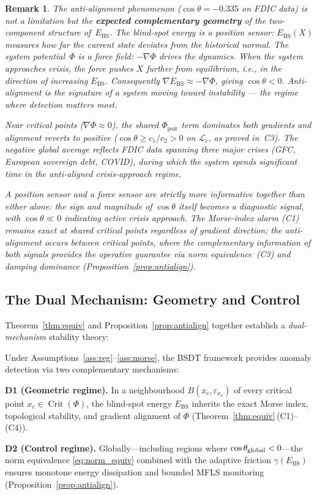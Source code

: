 \documentclass[final]{siamltex}
\providecommand{\grad}{\nabla}
\newcommand{\Ebs}{E_{\mathrm{BS}}}
\newcommand{\costheta}{\cos\theta}
\newtheorem{remark}[theorem]{Remark}
\begin{document}
\begin{remark}\label{rem:antialign_meaning}
The anti-alignment phenomenon ($\costheta = -0.335$ on FDIC data)
is not a limitation but the \textbf{expected complementary geometry}
of the two-component structure of~$\Ebs$.  The blind-spot energy
is a \emph{position sensor}: $\Ebs(X)$ measures how far the
current state deviates from the historical normal.  The system
potential~$\Phi$ is a \emph{force field}: $-\grad\Phi$ drives the
dynamics.  When the system approaches crisis, the force pushes $X$
further from equilibrium, i.e., in the direction of increasing
$\Ebs$.  Consequently $\grad\Ebs \approx -\grad\Phi$, giving
$\costheta < 0$.  Anti-alignment is the signature of a system
moving toward instability --- the regime where detection matters
most.

Near critical points ($\grad\Phi \approx 0$), the shared
$\Phi_{\mathrm{pair}}$ term dominates both gradients and
alignment reverts to positive ($\costheta \ge c_1/c_2 > 0$
on $\mathcal{L}_c$, as proved in~C3).  The negative global
average reflects FDIC data spanning three major crises
(GFC, European sovereign debt, COVID), during which the
system spends significant time in the anti-aligned
crisis-approach regime.

A position sensor and a force sensor are \emph{strictly more
informative together} than either alone: the sign and magnitude
of $\costheta$ itself becomes a diagnostic signal, with
$\costheta \ll 0$ indicating active crisis approach.
The Morse-index alarm (C1) remains exact at shared critical
points regardless of gradient direction; the anti-alignment
occurs between critical points, where the complementary
information of both signals provides the operative guarantee
via norm equivalence~(C3) and damping dominance
(Proposition~\ref{prop:antialign}).
\end{remark}

\subsection{The Dual Mechanism: Geometry and Control}\label{sec:dual}

Theorem~\ref{thm:equiv} and Proposition~\ref{prop:antialign}
together establish a \emph{dual-mechanism} stability theory:

\begin{theorem}\label{thm:dual}
Under Assumptions~\ref{ass:reg}--\ref{ass:morse}, the BSDT
framework provides anomaly detection via two complementary mechanisms:

\textbf{D1 (Geometric regime).}
In a neighbourhood $B(x_c,\varepsilon_{x_c})$ of every
critical point $x_c\in\operatorname{Crit}(\Phi)$, the blind-spot
energy $\Ebs$ inherits the exact Morse index, topological stability,
and gradient alignment of $\Phi$
(Theorem~\ref{thm:equiv}\,(C1)--(C4)).

\textbf{D2 (Control regime).}
Globally---including regions where
$\cos\theta_{\textup{global}} < 0$---the norm equivalence
\eqref{eq:norm_equiv} combined with the adaptive friction
$\gamma(\Ebs)$ ensures monotone energy dissipation and bounded
MFLS monitoring (Proposition~\ref{prop:antialign}).
\end{theorem}
\end{document}
